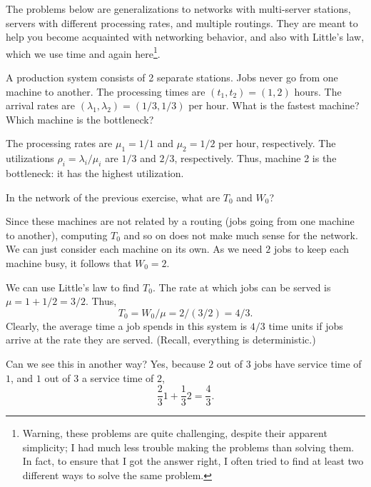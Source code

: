 The problems below are generalizations to networks with multi-server
stations, servers with different processing rates, and multiple
routings. They are meant to help you become acquainted with networking
behavior, and also with Little's law, which we use time and again
here\footnote{Warning, these problems are quite challenging, despite their apparent simplicity; I had much less trouble making the problems than solving them. In fact, to ensure that
I got the answer right, I often tried to find at least two different ways to
solve the same problem.}.

\begin{exercise}
 A production system consists of 2 separate stations. Jobs never go
 from one machine to another. The processing times are
 $(t_1, t_2) = (1, 2)$ hours. The arrival rates are
 $(\lambda_1, \lambda_2) = (1/3, 1/3)$ per hour. What is the fastest
 machine? Which machine is the bottleneck? 
\begin{solution}
 The processing rates are $\mu_1=1/1$ and $\mu_2 = 1/2$ per hour,
 respectively. The utilizations $\rho_i=\lambda_i/\mu_i$ are $1/3$
 and $2/3$, respectively. Thus, machine 2 is the bottleneck: it has
 the highest utilization.
\end{solution}
\end{exercise}

\begin{exercise}
In the network of the previous exercise, what are $T_0$ and $W_0$? 
\begin{solution}
Since these machines are not related by a routing (jobs going from
 one machine to another), computing $T_0$ and so on does not make
 much sense for the network. We can just consider each machine on
 its own. As we need $2$ jobs to keep each machine busy, it
 follows that $W_0=2$. 

We can use Little's law to find $T_0$. The rate at which jobs can be served is $\mu = 1+1/2 = 3/2$. Thus, 
\begin{equation*}
 T_0 = W_0/\mu = 2/(3/2)=4/3.
\end{equation*}
Clearly, the average time a job spends in this system is $4/3$ time units
if jobs arrive at the rate they are served. (Recall, everything is
deterministic.)

Can we see this in another way? Yes, because $2$ out of $3$ jobs have service time of $1$, and $1$ out of $3$ a service time of $2$,
\begin{equation*}
 \frac23 1 + \frac 1 3 2 = \frac 4 3.
\end{equation*}
\end{solution}
\end{exercise}



